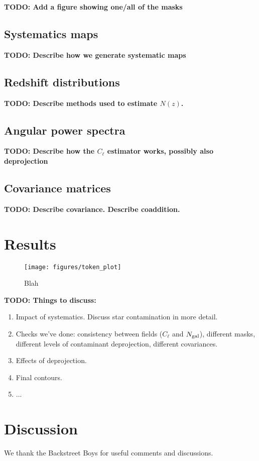 \documentclass[a4paper,11pt]{article}
\newcommand{\todo}[1]{{\bf TODO: #1}}
\begin{document}
    \todo{Add a figure showing one/all of the masks}

  \subsection{Systematics maps}\label{ssec:methods.syst}
    \todo{Describe how we generate systematic maps}
    \lipsum[3]

  \subsection{Redshift distributions}\label{ssec:methods.nz}
    \todo{Describe methods used to estimate $N(z)$.}
    \lipsum[5]

  \subsection{Angular power spectra}\label{ssec:methods.cell}
    \todo{Describe how the $C_\ell$ estimator works, possibly also deprojection}
    \lipsum[6]

  \subsection{Covariance matrices}\label{ssec:methods.covar}
    \todo{Describe covariance. Describe coaddition.}
    \lipsum[7]
    
\section{Results}\label{sec:results}
  \lipsum[8]
  \begin{figure}
    \centering
    \texttt{[image: figures/token\_plot]}
    \caption{Blah}\label{fig:token}
  \end{figure}
  \todo{Things to discuss:}
  \begin{enumerate}
    \item Impact of systematics. Discuss star contamination in more detail.
    \item Checks we've done: consistency between fields ($C_\ell$ and $N_{\rm gal}$), different masks, different levels of contaminant deprojection, different covariances.
    \item Effects of deprojection.
    \item Final contours.
    \item ...
  \end{enumerate}

\section{Discussion}\label{sec:discussion}
  \lipsum[9]

\acknowledgments

We thank the Backstreet Boys for useful comments and discussions.


\end{document}

